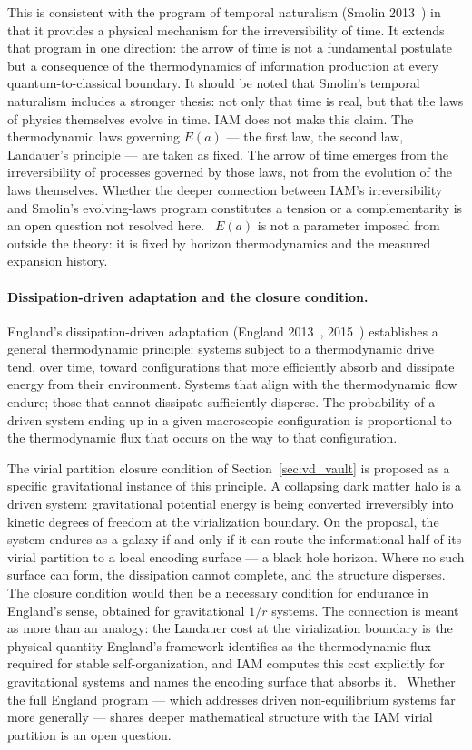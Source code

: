 This is consistent with the program of temporal naturalism (Smolin 2013~\cite{Smolin2013}) in that it provides a physical mechanism for the
irreversibility of time. It extends that program in one direction: the arrow of time is not a fundamental postulate but a consequence of the
thermodynamics of information production at every quantum-to-classical boundary. It should be noted that Smolin's temporal naturalism includes a stronger
thesis: not only that time is real, but that the laws of physics themselves evolve in time. IAM does not make this claim. The thermodynamic laws governing
$E(a)$ --- the first law, the second law, Landauer's principle --- are taken as fixed. The arrow of time emerges from the irreversibility of processes governed
by those laws, not from the evolution of the laws themselves. Whether the deeper connection between IAM's irreversibility and Smolin's evolving-laws
program constitutes a tension or a complementarity is an open question not resolved here. \openprob\ $E(a)$ is not a parameter imposed from outside the
theory: it is fixed by horizon thermodynamics and the measured expansion history.

\paragraph{Dissipation-driven adaptation and the closure condition.} England's dissipation-driven adaptation (England 2013~\cite{England2013},
2015~\cite{England2015}) establishes a general thermodynamic principle: systems subject to a thermodynamic drive tend, over time, toward configurations that
more efficiently absorb and dissipate energy from their environment. Systems that align with the thermodynamic flow endure; those that cannot dissipate
sufficiently disperse. The probability of a driven system ending up in a given macroscopic configuration is proportional to the thermodynamic flux that
occurs on the way to that configuration.

The virial partition closure condition of Section~\ref{sec:vd_vault} is proposed as a specific gravitational instance of this principle. A collapsing dark
matter halo is a driven system: gravitational potential energy is being converted irreversibly into kinetic degrees of freedom at the virialization
boundary. On the proposal, the system endures as a galaxy if and only if it can route the informational half of its virial partition to a local encoding
surface --- a black hole horizon. Where no such surface can form, the dissipation cannot complete, and the structure disperses. The closure condition would
then be a necessary condition for endurance in England's sense, obtained for gravitational $1/r$ systems. The connection is meant as more than an analogy: the
Landauer cost at the virialization boundary is the physical quantity England's framework identifies as the thermodynamic flux required for stable
self-organization, and IAM computes this cost explicitly for gravitational systems and names the encoding surface that absorbs it. \conjecture\ Whether the full England program ---
which addresses driven non-equilibrium systems far more generally --- shares deeper mathematical structure with the IAM virial partition is an open question.
\openprob

